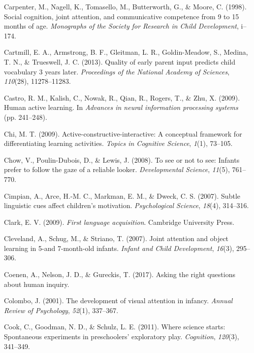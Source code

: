 \documentclass[oneside]{report}
\begin{document}
\hypertarget{ref-carpenter1998social}{}
Carpenter, M., Nagell, K., Tomasello, M., Butterworth, G., \& Moore, C.
(1998). Social cognition, joint attention, and communicative competence
from 9 to 15 months of age. \emph{Monographs of the Society for Research
in Child Development}, i--174.

\hypertarget{ref-cartmill2013quality}{}
Cartmill, E. A., Armstrong, B. F., Gleitman, L. R., Goldin-Meadow, S.,
Medina, T. N., \& Trueswell, J. C. (2013). Quality of early parent input
predicts child vocabulary 3 years later. \emph{Proceedings of the
National Academy of Sciences}, \emph{110}(28), 11278--11283.

\hypertarget{ref-castro2009human}{}
Castro, R. M., Kalish, C., Nowak, R., Qian, R., Rogers, T., \& Zhu, X.
(2009). Human active learning. In \emph{Advances in neural information
processing systems} (pp. 241--248).

\hypertarget{ref-chi2009active}{}
Chi, M. T. (2009). Active-constructive-interactive: A conceptual
framework for differentiating learning activities. \emph{Topics in
Cognitive Science}, \emph{1}(1), 73--105.

\hypertarget{ref-chow2008see}{}
Chow, V., Poulin-Dubois, D., \& Lewis, J. (2008). To see or not to see:
Infants prefer to follow the gaze of a reliable looker.
\emph{Developmental Science}, \emph{11}(5), 761--770.

\hypertarget{ref-cimpian2007subtle}{}
Cimpian, A., Arce, H.-M. C., Markman, E. M., \& Dweck, C. S. (2007).
Subtle linguistic cues affect children's motivation. \emph{Psychological
Science}, \emph{18}(4), 314--316.

\hypertarget{ref-clark2009first}{}
Clark, E. V. (2009). \emph{First language acquisition}. Cambridge
University Press.

\hypertarget{ref-cleveland2007joint}{}
Cleveland, A., Schug, M., \& Striano, T. (2007). Joint attention and
object learning in 5-and 7-month-old infants. \emph{Infant and Child
Development}, \emph{16}(3), 295--306.

\hypertarget{ref-coenen2017asking}{}
Coenen, A., Nelson, J. D., \& Gureckis, T. (2017). Asking the right
questions about human inquiry.

\hypertarget{ref-colombo2001development}{}
Colombo, J. (2001). The development of visual attention in infancy.
\emph{Annual Review of Psychology}, \emph{52}(1), 337--367.

\hypertarget{ref-cook2011science}{}
Cook, C., Goodman, N. D., \& Schulz, L. E. (2011). Where science starts:
Spontaneous experiments in preschoolers' exploratory play.
\emph{Cognition}, \emph{120}(3), 341--349.
\end{document}

